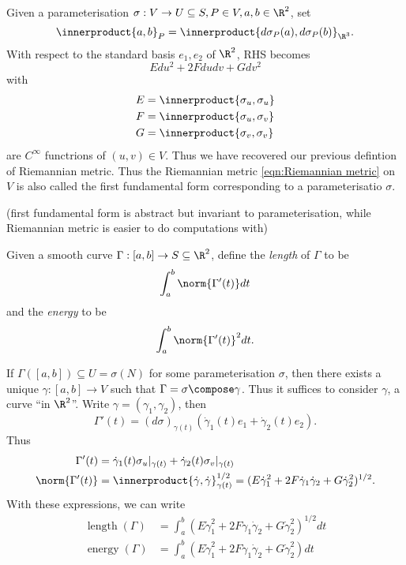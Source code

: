 \documentclass[a4paper]{article}
\theoremstyle{definition}
\newcommand*{\inner}{\innerproduct}
\begin{document}
Given a parameterisation \(\sigma: V \to U \subseteq S, P \in V, a, b \in \R^2\), set
\[
  \inner{a, b}_P = \inner{d\sigma_P(a), d\sigma_P(b)}_{\R^3}.
\]
With respect to the standard basis \(e_1, e_2\) of \(\R^2\), RHS becomes
\begin{equation}
  \label{eqn:Riemmanian metric}
  Edu^2 + 2Fdudv + Gdv^2
  \tag{\(\ast\)}
\end{equation}
with
\begin{align*}
  E &= \inner{\sigma_u, \sigma_u} \\
  F &= \inner{\sigma_u, \sigma_v} \\
  G &= \inner{\sigma_v, \sigma_v}
\end{align*}
are \(C^\infty\) functrions of \((u, v) \in V\). Thus we have recovered our previous defintion of Riemannian metric. Thus the Riemannian metric \eqref{eqn:Riemannian metric} on \(V\) is also called the first fundamental form corresponding to a parameterisatio \(\sigma\).

(first fundamental form is abstract but invariant to parameterisation, while Riemannian metric is easier to do computations with)

\begin{definition}
  Given a smooth curve \(\Gamma: [a, b] \to S \subseteq \R^2\), define the \emph{length} of \(\Gamma\) to be
  \[
    \int_a^b \norm{\Gamma'(t)} dt
  \]
  and the \emph{energy} to be
  \[
    \int_a^b \norm{\Gamma'(t)}^2 dt.
  \]
\end{definition}

If \(\Gamma([a, b]) \subseteq U = \sigma(N)\) for some parameterisation \(\sigma\), then there exists a unique \(\gamma: [a, b] \to V\) such that \(\Gamma = \sigma \compose \gamma\). Thus it suffices to consider \(\gamma\), a curve ``in \(\R^2\)''. Write \(\gamma = (\gamma_1, \gamma_2)\), then
\[
  \Gamma'(t) = (d\sigma)_{\gamma(t)} (\dot \gamma_1(t)e_1 + \dot \gamma_2(t)e_2).
\]
Thus
\begin{align*}
  \Gamma'(t) &= \dot \gamma_1(t) \sigma_u|_{\gamma(t)} + \dot \gamma_2(t) \sigma_v|_{\gamma(t)} \\
  \norm{\Gamma'(t)} &= \inner{\dot \gamma, \dot \gamma}^{1/2}_{\gamma(t)} = (E \dot \gamma_1^2 + 2F \dot \gamma_1 \dot \gamma_2 + G \dot \gamma_2^2)^{1/2}.
\end{align*}
With these expressions, we can write
\begin{align*}
  \operatorname{length}(\Gamma) &= \int_a^b (E \dot \gamma_1^2 + 2F \dot \gamma_1 \dot \gamma_2 + G \dot \gamma_2^2)^{1/2} dt \\
  \operatorname{energy}(\Gamma) &= \int_a^b (E \dot \gamma_1^2 + 2F \dot \gamma_1 \dot \gamma_2 + G \dot \gamma_2^2) dt
\end{align*}
\end{document}
